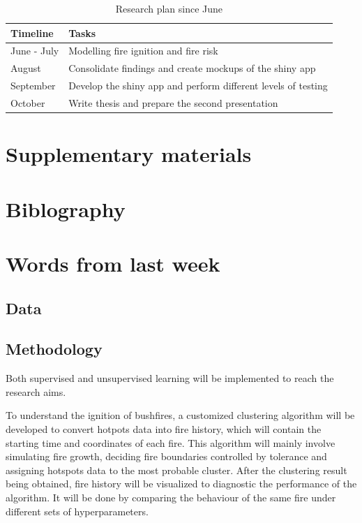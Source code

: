 \documentclass{monashthesis}
\begin{document}
\begin{table}[!h]

\caption{\label{tab:timeline2}Research plan since June}
\centering
\begin{tabular}[t]{ll}
\toprule
Timeline & Tasks\\
\midrule
June - July & Modelling fire ignition and fire risk\\
August & Consolidate findings and create mockups of the shiny app\\
September & Develop the shiny app and perform different levels of testing\\
October & Write thesis and prepare the second presentation\\
\bottomrule
\end{tabular}
\end{table}

\hypertarget{supplementary-materials}{%
\chapter{Supplementary materials}\label{supplementary-materials}}

\hypertarget{biblography}{%
\chapter{Biblography}\label{biblography}}

\hypertarget{words-from-last-week}{%
\chapter{Words from last week}\label{words-from-last-week}}

\hypertarget{data}{%
\section{Data}\label{data}}

\hypertarget{methodology}{%
\section{Methodology}\label{methodology}}

Both supervised and unsupervised learning will be implemented to reach the research aims.

To understand the ignition of bushfires, a customized clustering algorithm will be developed to convert hotpots data into fire history, which will contain the starting time and coordinates of each fire. This algorithm will mainly involve simulating fire growth, deciding fire boundaries controlled by tolerance and assigning hotspots data to the most probable cluster. After the clustering result being obtained, fire history will be visualized to diagnostic the performance of the algorithm. It will be done by comparing the behaviour of the same fire under different sets of hyperparameters.
\end{document}
